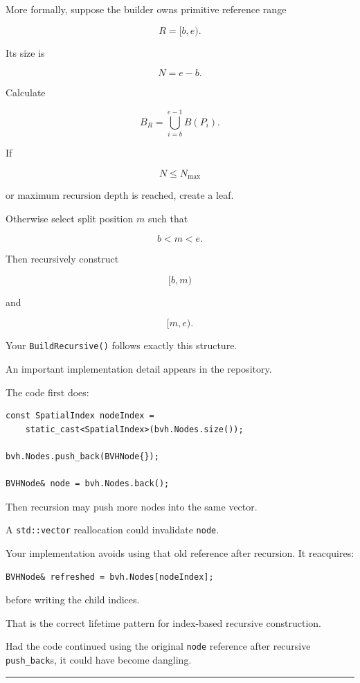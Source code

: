 More formally, suppose the builder owns primitive reference range

\[
R=[b,e).
\]

Its size is

\[
N=e-b.
\]

Calculate

\[
B_R=\bigcup_{i=b}^{e-1}B(P_i).
\]

If

\[
N\le N_{\max}
\]

or maximum recursion depth is reached, create a leaf.

Otherwise select split position \(m\) such that

\[
b<m<e.
\]

Then recursively construct

\[
[b,m)
\]

and

\[
[m,e).
\]

Your \texttt{BuildRecursive()} follows exactly this structure.

An important implementation detail appears in the repository.

The code first does:

\begin{verbatim}
const SpatialIndex nodeIndex =
    static_cast<SpatialIndex>(bvh.Nodes.size());

bvh.Nodes.push_back(BVHNode{});

BVHNode& node = bvh.Nodes.back();
\end{verbatim}

Then recursion may push more nodes into the same vector.

A \texttt{std::vector} reallocation could invalidate \texttt{node}.

Your implementation avoids using that old reference after recursion. It reacquires:

\begin{verbatim}
BVHNode& refreshed = bvh.Nodes[nodeIndex];
\end{verbatim}

before writing the child indices.

That is the correct lifetime pattern for index-based recursive construction.

Had the code continued using the original \texttt{node} reference after recursive \texttt{push\_back}s, it could have become dangling.

\begin{center}\rule{0.5\linewidth}{0.5pt}\end{center}

